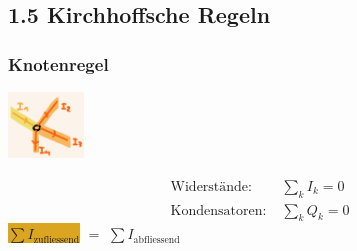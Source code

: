\subsection*{1.5 Kirchhoffsche Regeln}
    \subsubsection*{Knotenregel}
    \vspace{-1mm}
    \begin{minipage}{0.49\linewidth}
        \begin{footnotesize}
            \begin{center}
                \vspace{2mm}
                \includegraphics[width = 20mm]{src/images/knotenregel.png}
            \end{center}
        \end{footnotesize}
    \end{minipage}
    \begin{minipage}{0.5\linewidth}
        \begin{scriptsize}
            \begin{center}
                \begin{align*}
                    \text{Widerstände:} \; &\sum\limits_k I_k = 0\\
                    \text{Kondensatoren:} \; &\sum\limits_k Q_k = 0
                \end{align*}
                \colorbox{Goldenrod}{$\sum I_\text{zufliessend}$} $=$ \colorbox{Apricot}{$\sum I_\text{abfliessend}$} 
            \end{center}
        \end{scriptsize}
    \end{minipage}
    \vspace{1mm}

